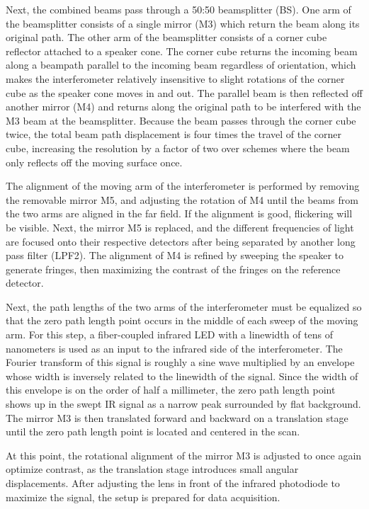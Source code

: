 \documentclass[12pt]{report}
\begin{document}
Next, the combined beams pass through a 50:50 beamsplitter (BS). One arm of the beamsplitter consists of a single mirror (M3) which return the beam along its original path. The other arm of the beamsplitter consists of a corner cube reflector attached to a speaker cone. The corner cube returns the incoming beam along a beampath parallel to the incoming beam regardless of orientation, which makes the interferometer relatively insensitive to slight rotations of the corner cube as the speaker cone moves in and out. The parallel beam is then reflected off another mirror (M4) and returns along the original path to be interfered with the M3 beam at the beamsplitter. Because the beam passes through the corner cube twice, the total beam path displacement is four times the travel of the corner cube, increasing the resolution by a factor of two over schemes where the beam only reflects off the moving surface once.

The alignment of the moving arm of the interferometer is performed by removing the removable mirror M5, and adjusting the rotation of M4 until the beams from the two arms are aligned in the far field. If the alignment is good, flickering will be visible. Next, the mirror M5 is replaced, and the different frequencies of light are focused onto their respective detectors after being separated by another long pass filter (LPF2). The alignment of M4 is refined by sweeping the speaker to generate fringes, then maximizing the contrast of the fringes on the reference detector.

Next, the path lengths of the two arms of the interferometer must be equalized so that the zero path length point occurs in the middle of each sweep of the moving arm. For this step, a fiber-coupled infrared LED with a linewidth of tens of nanometers is used as an input to the infrared side of the interferometer. The Fourier transform of this signal is roughly a sine wave multiplied by an envelope whose width is inversely related to the linewidth of the signal. Since the width of this envelope is on the order of half a millimeter, the zero path length point shows up in the swept IR signal as a narrow peak surrounded by flat background. The mirror M3 is then translated forward and backward on a translation stage until the zero path length point is located and centered in the scan.

At this point, the rotational alignment of the mirror M3 is adjusted to once again optimize contrast, as the translation stage introduces small angular displacements. After adjusting the lens in front of the infrared photodiode to maximize the signal, the setup is prepared for data acquisition.
\end{document}
